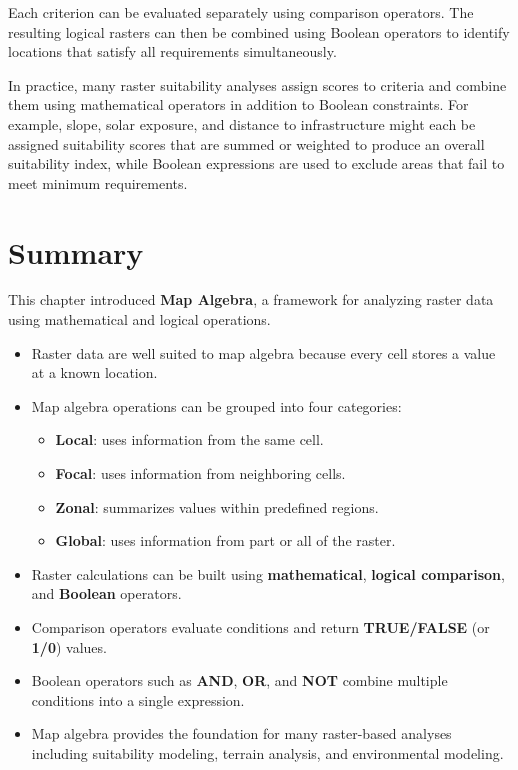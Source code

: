 \documentclass[
  letterpaper,
]{book}
\providecommand{\tightlist}{%
  \setlength{\itemsep}{0pt}\setlength{\parskip}{0pt}}
\begin{document}
Each criterion can be evaluated separately using comparison operators.
The resulting logical rasters can then be combined using Boolean
operators to identify locations that satisfy all requirements
simultaneously.

In practice, many raster suitability analyses assign scores to criteria
and combine them using mathematical operators in addition to Boolean
constraints. For example, slope, solar exposure, and distance to
infrastructure might each be assigned suitability scores that are summed
or weighted to produce an overall suitability index, while Boolean
expressions are used to exclude areas that fail to meet minimum
requirements.

\section{Summary}\label{summary-8}

This chapter introduced \textbf{Map Algebra}, a framework for analyzing
raster data using mathematical and logical operations.

\begin{itemize}
\item
  Raster data are well suited to map algebra because every cell stores a
  value at a known location.
\item
  Map algebra operations can be grouped into four categories:

  \begin{itemize}
  \tightlist
  \item
    \textbf{Local}: uses information from the same cell.
  \item
    \textbf{Focal}: uses information from neighboring cells.
  \item
    \textbf{Zonal}: summarizes values within predefined regions.
  \item
    \textbf{Global}: uses information from part or all of the raster.
  \end{itemize}
\item
  Raster calculations can be built using \textbf{mathematical},
  \textbf{logical comparison}, and \textbf{Boolean} operators.
\item
  Comparison operators evaluate conditions and return
  \textbf{TRUE/FALSE} (or \textbf{1/0}) values.
\item
  Boolean operators such as \textbf{AND}, \textbf{OR}, and \textbf{NOT}
  combine multiple conditions into a single expression.
\item
  Map algebra provides the foundation for many raster-based analyses
  including suitability modeling, terrain analysis, and environmental
  modeling.
\end{itemize}
\end{document}
